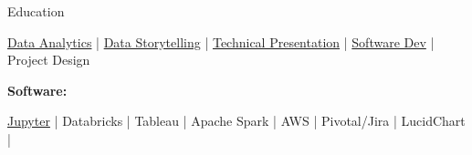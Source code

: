 \documentclass{resume/resume}
\begin{document}
\begin{rSection}{Education}
\begin{adjustwidth}{6em}{0pt}
  \href{https://github.com/UtahTriangle/Laws/blob/main/Proposals/NationalsHelp/geography_hypos.ipynb}{Data Analytics} |  %
  \href{https://spelkington.github.io/assets/utah_office_update.pdf#page=17}{Data Storytelling} |  %
  \href{https://www.youtube.com/watch?v=lMFQp3wN-cg}{Technical Presentation} |
  \href{https://github.com/spelkington}{Software Dev} |
  Project Design
  
\end{adjustwidth}


%
%
%
\vspace{-3pt}
{\bf Software:}
\vspace{-1.83em}
\begin{adjustwidth}{6em}{0pt}
  \href{https://github.com/search?q=user\%3ASpelkington+user\%3AUtahTriangle+extension\%3Aipynb&type=Code}{Jupyter} | 
  Databricks | 
  Tableau | 
  Apache Spark | 
  AWS | 
  Pivotal/Jira | 
  LucidChart |


\end{adjustwidth}
\end{rSection}
\end{document}
